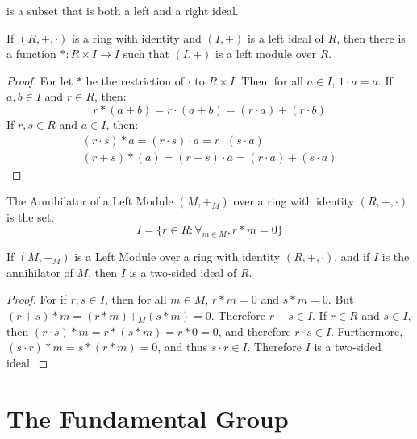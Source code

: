     is a subset that is both a left and a right ideal.
    \begin{theorem}
        If $(R,+,\cdot)$ is a ring with identity
        and $(I,+)$ is a left ideal
        of $R$, then there is a function
        $*:R\times{I}\rightarrow{I}$ such that
        $(I,+)$ is a left module over $R$.
    \end{theorem}
    \begin{proof}
        For let $*$ be the restriction of $\cdot$ to
        $R\times{I}$. Then, for all $a\in{I}$,
        $1\cdot{a}=a$. If $a,b\in{I}$ and $r\in{R}$, then:
        \begin{equation*}
            r*(a+b)
            =r\cdot(a+b)
            =(r\cdot{a})+(r\cdot{b})
        \end{equation*}
        If $r,s\in{R}$ and $a\in{I}$, then:
        \begin{gather*}
            (r\cdot{s})*a
            =(r\cdot{s})\cdot{a}
            =r\cdot(s\cdot{a})\\
            (r+s)*(a)
            =(r+s)\cdot{a}
            =(r\cdot{a})+(s\cdot{a})
        \end{gather*}
    \end{proof}
    \begin{definition}
        The Annihilator of a Left Module $(M,+_{M})$ over
        a ring with identity $(R,+,\cdot)$ is the set:
        \begin{equation*}
            I=\{r\in{R}:\forall_{m\in{M}},r*m=0\}
        \end{equation*}
    \end{definition}
    \begin{theorem}
        If $(M,+_{M})$ is a Left Module over a ring with
        identity $(R,+,\cdot)$, and if $I$ is the
        annihilator of $M$, then $I$ is a two-sided
        ideal of $R$.
    \end{theorem}
    \begin{proof}
        For if $r,s\in{I}$, then for all $m\in{M}$,
        $r*m=0$ and $s*m=0$. But $(r+s)*m=(r*m)+_{M}(s*m)=0$.
        Therefore $r+s\in{I}$. If $r\in{R}$ and $s\in{I}$,
        then $(r\cdot{s})*m=r*(s*m)=r*0=0$, and therefore
        $r\cdot{s}\in{I}$. Furthermore,
        $(s\cdot{r})*m=s*(r*m)=0$, and thus $s\cdot{r}\in{I}$.
        Therefore $I$ is a two-sided ideal.
    \end{proof}
\section{The Fundamental Group}
